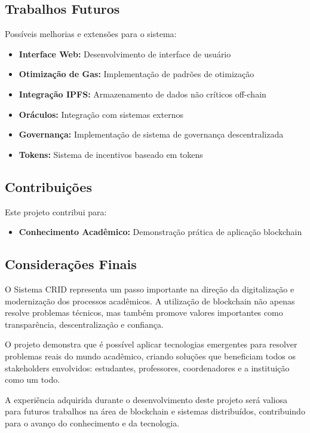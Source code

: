 \documentclass[12pt,a4paper]{article}
\begin{document}
\subsection{Trabalhos Futuros}

Possíveis melhorias e extensões para o sistema:

\begin{itemize}
    \item \textbf{Interface Web:} Desenvolvimento de interface de usuário
    \item \textbf{Otimização de Gas:} Implementação de padrões de otimização
    \item \textbf{Integração IPFS:} Armazenamento de dados não críticos off-chain
    \item \textbf{Oráculos:} Integração com sistemas externos
    \item \textbf{Governança:} Implementação de sistema de governança descentralizada
    \item \textbf{Tokens:} Sistema de incentivos baseado em tokens
\end{itemize}

\subsection{Contribuições}

Este projeto contribui para:

\begin{itemize}
    \item \textbf{Conhecimento Acadêmico:} Demonstração prática de aplicação blockchain
\end{itemize}

\subsection{Considerações Finais}

O Sistema CRID representa um passo importante na direção da digitalização e modernização dos processos acadêmicos. A utilização de blockchain não apenas resolve problemas técnicos, mas também promove valores importantes como transparência, descentralização e confiança.

O projeto demonstra que é possível aplicar tecnologias emergentes para resolver problemas reais do mundo acadêmico, criando soluções que beneficiam todos os stakeholders envolvidos: estudantes, professores, coordenadores e a instituição como um todo.

A experiência adquirida durante o desenvolvimento deste projeto será valiosa para futuros trabalhos na área de blockchain e sistemas distribuídos, contribuindo para o avanço do conhecimento e da tecnologia.
\end{document}
